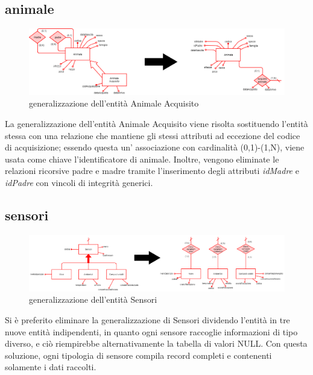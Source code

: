 \documentclass[12pt,a4paper]{article}
\begin{document}
\subsection{animale}
\begin{figure}[H]
\centering
\includegraphics[scale=2, width=1.15\textwidth]{ridondanze/animale.png}
\caption{ge\-ne\-ra\-liz\-za\-zio\-ne dell'entità Animale Acquisito}
\end{figure}
La ge\-ne\-ra\-liz\-za\-zio\-ne dell'entità Animale Acquisito viene risolta sostituendo l'entità stessa con una relazione che mantiene gli stessi attributi ad eccezione del codice di acquisizione; essendo questa un' associazione con cardinalità (0,1)-(1,N), viene usata come chiave l'identificatore di animale. Inoltre, vengono eliminate le relazioni ricorsive padre e madre tramite l'inserimento degli attributi \textit{idMadre} e \textit{idPadre} con vincoli di integrità generici.
\subsection{sensori}
\begin{figure}[H]
\centering
\includegraphics[scale=2, width=1.15\textwidth]{ridondanze/sensori.png}
\caption{ge\-ne\-ra\-liz\-za\-zio\-ne dell'entità Sensori}
\end{figure}
Si è preferito eliminare la ge\-ne\-ra\-liz\-za\-zio\-ne di Sensori dividendo l'entità in tre nuove entità indipendenti, in quanto ogni sensore raccoglie informazioni di tipo diverso, e ciò riempirebbe alternativamente la tabella di valori NULL. Con questa soluzione, ogni tipologia di sensore compila record completi e contenenti solamente i dati raccolti.
\end{document}
